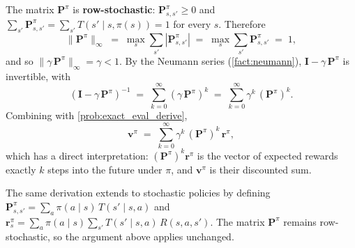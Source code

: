 \documentclass[11pt]{article}
\begin{document}
\begin{solution}
The matrix $\mathbf{P}^\pi$ is \textbf{row-stochastic}: $\mathbf{P}^\pi_{s,s'} \ge 0$ and $\sum_{s'} \mathbf{P}^\pi_{s,s'} = \sum_{s'} T(s' \mid s, \pi(s)) = 1$ for every $s$. Therefore
$$
\|\mathbf{P}^\pi\|_\infty \;=\; \max_s \sum_{s'} |\mathbf{P}^\pi_{s,s'}| \;=\; \max_s \sum_{s'} \mathbf{P}^\pi_{s,s'} \;=\; 1,
$$
and so $\|\gamma\, \mathbf{P}^\pi\|_\infty = \gamma < 1$. By the Neumann series (\cref{fact:neumann}), $\mathbf{I} - \gamma\, \mathbf{P}^\pi$ is invertible, with
$$
(\mathbf{I} - \gamma\, \mathbf{P}^\pi)^{-1} \;=\; \sum_{k=0}^{\infty} (\gamma\, \mathbf{P}^\pi)^k \;=\; \sum_{k=0}^{\infty} \gamma^k\, (\mathbf{P}^\pi)^k.
$$
Combining with \cref{prob:exact_eval_derive},
$$
\mathbf{v}^\pi \;=\; \sum_{k=0}^{\infty} \gamma^k\, (\mathbf{P}^\pi)^k\, \mathbf{r}^\pi,
$$
which has a direct interpretation: $(\mathbf{P}^\pi)^k \mathbf{r}^\pi$ is the vector of expected rewards exactly $k$ steps into the future under $\pi$, and $\mathbf{v}^\pi$ is their discounted sum.
\end{solution}

\begin{remark}
The same derivation extends to stochastic policies by defining $\mathbf{P}^\pi_{s,s'} = \sum_{a} \pi(a \mid s)\, T(s' \mid s, a)$ and $\mathbf{r}^\pi_s = \sum_{a} \pi(a \mid s) \sum_{s'} T(s' \mid s, a)\, R(s, a, s')$. The matrix $\mathbf{P}^\pi$ remains row-stochastic, so the argument above applies unchanged.
\end{remark}





\end{document}
